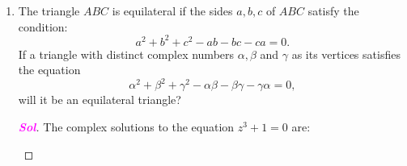 \documentclass{article}
\theoremstyle{definition}
\newcommand{\of}[1]{\left( #1 \right)}
\newcommand{\sol}{\textcolor{magenta}{\bf Sol}}
\begin{document}
\begin{enumerate}
\begin{proof}[\sol]
\begin{enumerate}
\begin{align*}
				 f'(0)=\lim\limits_{\Delta z\to 0}\frac{f\of{0+\Delta z}-f(0)}{\Delta z}&=\lim\limits_{\Delta t\to 0}\frac{f\of{1+\of{1+i}\Delta t}-f\of{0}}{\of{1+i}\Delta t}\\
				 &=\lim\limits_{\Delta t\to 0}\frac{\displaystyle\frac{3{\Delta t}^3-2{\Delta t}^3}{3{\Delta t}^2+2{\Delta t}^2}+i\frac{3{\Delta t}^3+2{\Delta t}^3}{3{\Delta t}^2+2{\Delta t}^2}}{\of{1+i}{\Delta t}}\\
				 &=\lim\limits_{\Delta t\to 0}\frac{1/5+i}{1+i}=\frac{3}{5}+\frac{2}{5}i\neq 1+i.
				\end{align*}
			\end{enumerate}
		\end{proof}
		
		\newpage
		\item The triangle $ABC$ is equilateral if the sides $a, b, c$ of $ABC$ satisfy the condition: \[
		a^2 + b^2 + c^2 - ab - bc - ca = 0.
		\]
		If a triangle with distinct complex numbers $\alpha,\beta$ and $\gamma$ as its vertices satisfies the equation \[
		\alpha^2+\beta^2+\gamma^2-\alpha\beta-\beta\gamma-\gamma\alpha=0,
		\] will it be an equilateral triangle?
		\begin{proof}[\sol]
			The complex solutions to the equation $z^3 + 1 = 0$ are:
			\begin{center}
\end{center}
\end{proof}
\end{enumerate}
\end{document}
